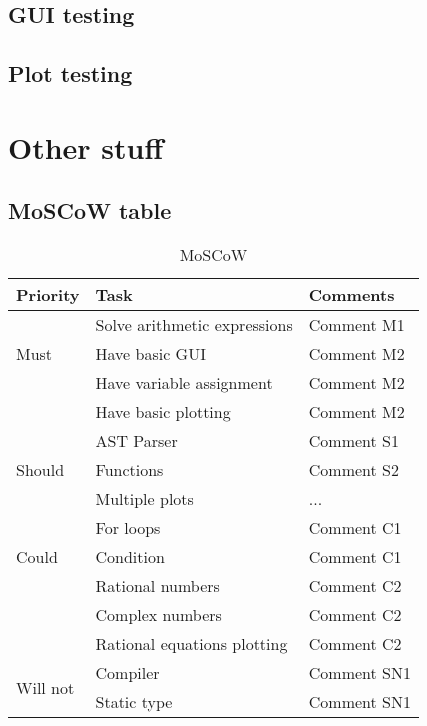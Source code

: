 \documentclass[a4paper, oneside, 11pt]{report}
\begin{document}
\section{GUI testing}

\section{Plot testing}

\chapter{Other stuff}
\section{MoSCoW table}
\label{appendix:moscow}
\begin{table}[h]
\caption{MoSCoW}
\begin{center}
\begin{tabular}{|p{1in}|p{2in}|p{2.5in}|} \hline
Priority & Task & Comments \\ \hline \hline
\multirow{3}{1in}{Must}
& Solve arithmetic expressions & Comment M1 \\ \cline{2-3}
& Have basic GUI & Comment M2 \\ \cline{2-3}
& Have variable assignment & Comment M2 \\ \cline{2-3}
& Have basic plotting & Comment M2 \\ \hline \hline
\multirow{3}{1in}{Should}
& AST Parser & Comment S1 \\ \cline{2-3}
& Functions & Comment S2 \\ \cline{2-3}
& Multiple plots & ... \\ \hline \hline
\multirow{3}{1in}{Could}
& For loops & Comment C1 \\ \cline{2-3}
& Condition & Comment C1 \\ \cline{2-3}
& Rational numbers & Comment C2 \\ \cline{2-3}
& Complex numbers & Comment C2 \\ \cline{2-3}
& Rational equations plotting & Comment C2 \\ \hline \hline
\multirow{3}{1in}{Will not}
& Compiler & Comment SN1 \\ \cline{2-3}
& Static type & Comment SN1 \\ \hline
\end{tabular}
\label{Table1}
\end{center}
\end{table}
\end{document}
